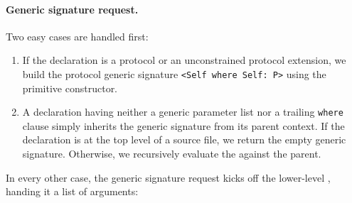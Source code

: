 \documentclass[../generics]{subfiles}
\begin{document}
\paragraph{Generic signature request.}
Two easy cases are handled first:
\begin{enumerate}
\item If the declaration is a protocol or an unconstrained protocol extension, we build the protocol generic signature \verb|<Self where Self: P>| using the primitive constructor.

\item A declaration having neither a generic parameter list nor a trailing \texttt{where} clause simply inherits the generic signature from its parent context. If the declaration is at the top level of a source file, we return the empty generic signature. Otherwise, we recursively evaluate the  against the parent.
\end{enumerate}
In every other case, the generic signature request kicks off the lower-level , handing it a list of arguments:
\end{document}

